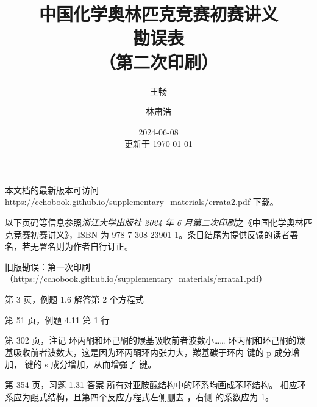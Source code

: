 \documentclass{errata}
\title{中国化学奥林匹克竞赛初赛讲义 \\ {\bfseries 勘误表} \\ （第二次印刷）}
\author{王畅 \and 林肃浩}
\date{2024-06-08 \\ 更新于 \today}
\begin{document}
    \maketitle
    本文档的最新版本可访问 \url{https://cchobook.github.io/supplementary_materials/errata2.pdf} 下载。

    以下页码等信息参照\emph{浙江大学出版社 2024 年 6 月第二次印刷}之《中国化学奥林匹克竞赛初赛讲义》，ISBN 为 978-7-308-23901-1。条目结尾为提供反馈的读者署名，若无署名则为作者自行订正。
    
    旧版勘误：第一次印刷（\url{https://cchobook.github.io/supplementary_materials/errata1.pdf}）

    \begin{Errata}
        \item[第 3 页，例题 1.6 解答第 2 个方程式]
            \Orig {}
            \Corr {}
        \item[第 51 页，例题 4.11 第 1 行]
            \Orig {}
            \Corr {}
        \item[第 302 页，注记]
            \Orig 环丙酮和环己酮的羰基吸收前者波数小……
            \Corr 环丙酮和环己酮的羰基吸收前者波数大，这是因为环丙酮环内张力大，羰基碳于环内  键的 p 成分增加， 键的 s 成分增加，从而增强了  键。
        \item[第 354 页，习题 1.31 答案]
            \Orig 所有对亚胺醌结构中的环系均画成苯环结构。
            \Corr 相应环系应为醌式结构，且第四个反应方程式左侧删去 ，右侧  的系数应为 1。
    \end{Errata}

    \renewcommand{\em}{\itshape}
    \renewcommand*{\bibfont}{\footnotesize}
    \renewcommand{\refname}{参考文献}
    \renewcommand{\bibname}{参考文献}
    \printbibliography
\end{document}
